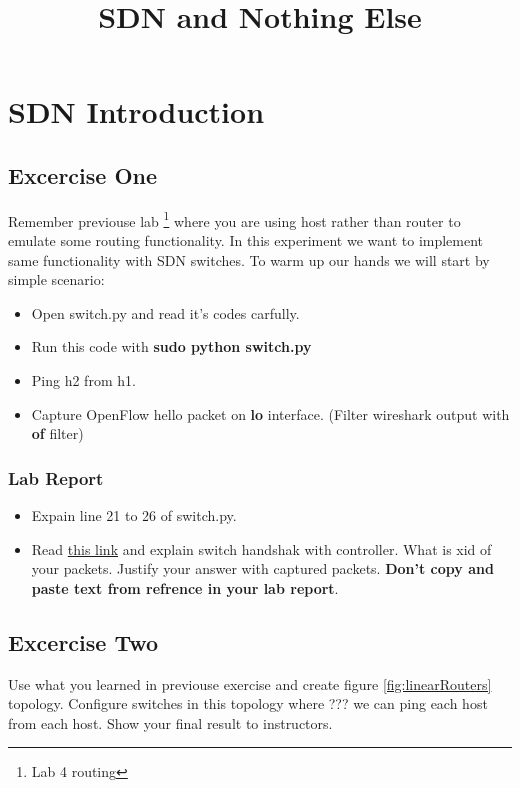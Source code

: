\documentclass{../UTNetLab}
\title{SDN and Nothing Else}
\author{%
    Dr. Ahmad Khonsari - \FR{دکتر احمد خونساری}\\
    \href{mailto:a_khonsari@ut.ac.ir}{a\_khonsari@ut.ac.ir}\\
    \vskip 1.5em%
    Amir Haji Ali Khamseh'i - \FR{امیر حاجی‌علی‌خمسه‌ء}\\
    \href{mailto:khamse@ut.ac.ir}{khamse@ut.ac.ir}\\
    \vskip 1.5em%
    \href{mailto:m.borhani@ut.ac.ir}{Muhammad Borhani} - \FR{محمد برهانی}\\
    \href{mailto:a.a.khordadi@ut.ac.ir}{Amirahmad Khordadi} - \FR{امیراحمد خردادی}\\
    \href{mailto:sina\_kashipazha@ut.ac.ir}{Sina Kashi pazha} - \FR{سینا کاشی‌پزها}
}
\begin{document}
    \maketitle

\section{SDN Introduction}
    \subsection{Excercise One}
    Remember previouse lab \footnote{Lab 4 routing} where you are using host rather than router to emulate some routing functionality. In this experiment we want to implement same functionality with SDN switches. To warm up our hands we will start by simple scenario:

    \begin{itemize}
    	\setlength{\itemindent}{10pt}
    	\item Open switch.py and read it's codes carfully.
    	\item Run this code with \textbf{sudo python switch.py}
    	\item Ping h2 from h1.
    	\item Capture OpenFlow hello packet on \textbf{lo} interface. (Filter wireshark output with \textbf{of} filter)
    \end{itemize}

    \subsubsection*{Lab Report}
    \begin{itemize}
    	\setlength{\itemindent}{0pt}
    	\item Expain line 21 to 26 of switch.py.
    	\item Read \href{http://flowgrammable.org/sdn/openflow/state-machine/}{this link} and explain switch handshak with controller. What is xid of your packets. Justify your answer with captured packets. \textbf{Don't copy and paste text from refrence in your lab report}.
    \end{itemize}

    \subsection{Excercise Two}
    Use what you learned in previouse exercise and create figure \ref{fig:linearRouters} topology. Configure switches in this topology where ??? we can ping each host from each host. Show your final result to instructors.
\end{document}
